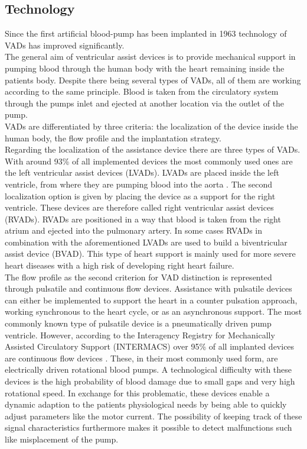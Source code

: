 \subsection{Technology}
Since the first artificial blood-pump has been implanted in 1963 \cite{VAD9} technology of VADs has improved significantly.
\\The general aim of ventricular assist devices is to provide mechanical support in pumping blood through the human body with the heart remaining inside the patients body. Despite there being several types of VADs, all of them are working according to the same principle. Blood is taken from the circulatory system through the pumps inlet and ejected at another location via the outlet of the pump. \cite{VAD1}
\\VADs are differentiated by three criteria: the localization of the device inside the human body, the flow profile and the implantation strategy.
\\Regarding the localization of the assistance device there are three types of VADs. With around 93{\%} of all implemented devices the most commonly used ones are the left ventricular assist devices (LVADs). \cite{VAD7} LVADs are placed inside the left ventricle, from where they are pumping blood into the aorta \cite{VAD4}. The second localization option is given by placing the device as a support for  the right ventricle. These devices are therefore called right ventricular assist devices (RVADs). RVADs are positioned in a way that blood is taken from the right atrium and ejected into the pulmonary artery. \cite{VAD7} In some cases RVADs in combination with the aforementioned LVADs are used to build a biventricular assist device (BVAD). This type of heart support is mainly used for more severe heart diseases with a high risk of developing right heart failure. \cite{VAD11}
\\The flow profile as the second criterion for VAD distinction is represented through pulsatile and continuous flow devices. Assistance with pulsatile devices can either be implemented to support the heart in a counter pulsation approach, working synchronous to the heart cycle, or as an asynchronous support. The most commonly known type of pulsatile device is a pneumatically driven pump ventricle. \cite{VAD1}
However, according to the Interagency Registry for Mechanically Assisted Circulatory Support (INTERMACS) over 95{\%} of all implanted devices are continuous flow devices \cite{VAD8}. These, in their most commonly used form, are electrically driven rotational blood pumps. A technological difficulty with these devices is the high probability of blood damage due to small gaps and very high rotational speed. In exchange for this problematic, these devices enable a dynamic adaption to the patients physiological needs by being able to quickly adjust parameters like the motor current. The possibility of keeping track of these signal characteristics furthermore makes it possible to detect malfunctions such like misplacement of the pump. \cite{VAD1}
